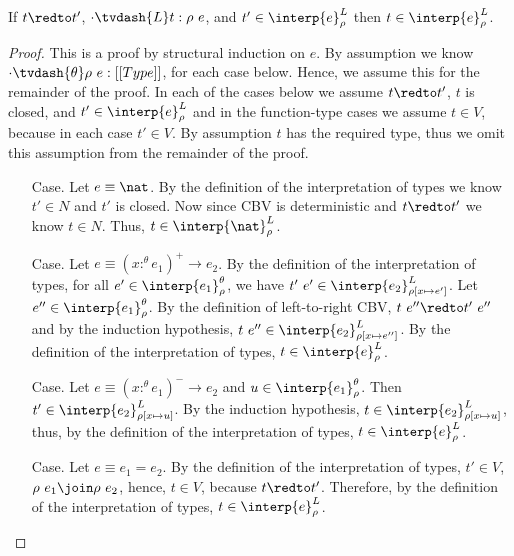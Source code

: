 \begin{lemma}[$\CRIII$]
  \label{lemma:criii}
  If $t \redto t'$, $\cdot \tvdash{L} t:\rho\ e$, and $t' \in \interp{e}^L_\rho$ 
  then $t \in \interp{e}^L_\rho$.
\end{lemma}
\begin{proof}
  This is a proof by structural induction on $e$.  
  By assumption we know $\cdot \tvdash{\theta} \rho\ e:[[Type]]$, for each case below.  Hence, we 
  assume this for the remainder of the proof.  In each of the cases below we assume
  $t \redto t'$, $t$ is closed, and $t' \in \interp{e}^L_\rho$ and in the function-type cases we 
  assume $t \in V$, because in each case $t' \in V$.  By assumption $t$ has the required type,
  thus we omit this assumption from the remainder of the proof.

  \begin{itemize}
  \item[Case.] Let $e \equiv \nat$.  
    By the definition of the interpretation of types we know
    $t' \in N$ and $t'$ is closed.  Now since CBV is deterministic and $t \redto t'$ we know
    $t \in N$.  Thus, $t \in \interp{\nat}^L_\rho$.

  \item[Case.] Let $e \equiv (x :^\theta e_1)^+ \rightarrow e_2$.    
    By the definition of the interpretation of types,
    for all $e' \in \interp{e_1}^\theta_\rho$, we have 
    $t'\ e' \in \interp{e_2}^L_{\rho[x \mapsto e']}$.
    Let $e'' \in \interp{e_1}^\theta_\rho$.  By the definition of left-to-right 
    CBV, $t\ e'' \redto t'\ e''$ and by the induction hypothesis, 
    $t\ e'' \in \interp{e_2}^L_{\rho[x \mapsto e'']}$.  By the definition of the interpretation of
    types, $t \in \interp{e}^L_{\rho}$.

  \item[Case.] Let $e \equiv (x :^\theta e_1)^- \to e_2$ and $u \in \interp{e_1}^\theta_\rho$.  
    Then $t' \in \interp{e_2}^L_{\rho[x \mapsto u]}$.  By the 
    induction hypothesis, $t \in \interp{e_2}^L_{\rho[x \mapsto u]}$, thus, by
    the definition of the interpretation of types, $t \in \interp{e}^L_\rho$.

  \item[Case.] Let $e \equiv e_1 = e_2$.
    By the definition of the interpretation of types, $t' \in V$,
    $\rho\ e_1 \join \rho\ e_2$, hence, $t \in V$, because 
    $t \redto t'$.  Therefore, 
    by the definition of the interpretation of types, $t \in \interp{e}^L_\rho$.
  \end{itemize}
\end{proof}
